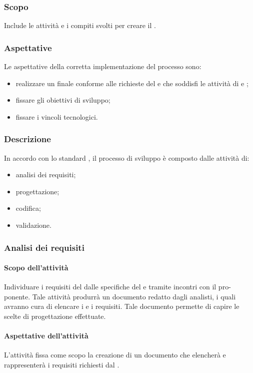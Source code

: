 \subsubsection{Scopo}
Include le attività e i compiti svolti per creare il .
\subsubsection{Aspettative}
Le aspettative della corretta implementazione del processo sono:
\begin{itemize}
		\item realizzare un  finale conforme alle richieste del  e che soddisfi le attività di  e ;
		\item fissare gli obiettivi di sviluppo;
		\item fissare i vincoli tecnologici.
\end{itemize}

\subsubsection{Descrizione}
In accordo con lo standard , il processo di sviluppo è composto dalle attività di:
\begin{itemize}
		\item analisi dei requisiti;
		\item progettazione;
		\item codifica;
		\item validazione.
\end{itemize}

\subsubsection{Analisi dei requisiti}
 \paragraph{Scopo dell'attività}
  Individuare i requisiti del  dalle specifiche del  e tramite incontri con il pro-
  ponente. Tale attività produrrà un documento redatto dagli analisti, i quali avranno cura di elencare i  e i requisiti. Tale documento permette di
 capire le scelte di progettazione effettuate.
 \paragraph{Aspettative dell'attività}
 L'attività fissa come scopo la creazione di un documento che elencherà e rappresenterà i requisiti richiesti dal .
